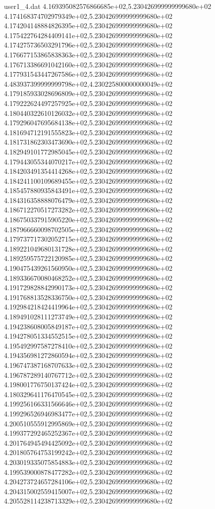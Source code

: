 \begin{filecontents}{user1_4.dat}
4.169395082576866685e+02,5.230426999999999680e+02
4.174168374702979349e+02,5.230426999999999680e+02
4.174204148884826395e+02,5.230426999999999680e+02
4.175422764284409141e+02,5.230426999999999680e+02
4.174275736503291796e+02,5.230426999999999680e+02
4.176677153865838363e+02,5.230426999999999680e+02
4.176713386691042160e+02,5.230426999999999680e+02
4.177931543447267586e+02,5.230426999999999680e+02
4.483937399999999798e+02,4.230225800000000049e+02
4.179185933028696809e+02,5.230426999999999680e+02
4.179222624497257925e+02,5.230426999999999680e+02
4.180440322610126032e+02,5.230426999999999680e+02
4.179296047695684138e+02,5.230426999999999680e+02
4.181694712191555823e+02,5.230426999999999680e+02
4.181731862303473690e+02,5.230426999999999680e+02
4.182949101772985045e+02,5.230426999999999680e+02
4.179443055344070217e+02,5.230426999999999680e+02
4.184203491354414268e+02,5.230426999999999680e+02
4.184241100109689455e+02,5.230426999999999680e+02
4.185457880935843491e+02,5.230426999999999680e+02
4.184316358888076479e+02,5.230426999999999680e+02
4.186712270517273282e+02,5.230426999999999680e+02
4.186750337915905220e+02,5.230426999999999680e+02
4.187966660098702505e+02,5.230426999999999680e+02
4.179737717302052715e+02,5.230426999999999680e+02
4.189221049680131728e+02,5.230426999999999680e+02
4.189259575722120985e+02,5.230426999999999680e+02
4.190475439261560950e+02,5.230426999999999680e+02
4.189336670080468252e+02,5.230426999999999680e+02
4.191729828842990173e+02,5.230426999999999680e+02
4.191768813528336750e+02,5.230426999999999680e+02
4.192984218424419964e+02,5.230426999999999680e+02
4.189491028111273749e+02,5.230426999999999680e+02
4.194238608005849187e+02,5.230426999999999680e+02
4.194278051334552515e+02,5.230426999999999680e+02
4.195492997587278410e+02,5.230426999999999680e+02
4.194356981272860594e+02,5.230426999999999680e+02
4.196747387168707633e+02,5.230426999999999680e+02
4.196787289140767712e+02,5.230426999999999680e+02
4.198001776750137424e+02,5.230426999999999680e+02
4.180329641176470545e+02,5.230426999999999680e+02
4.199256166331566646e+02,5.230426999999999680e+02
4.199296526946983477e+02,5.230426999999999680e+02
4.200510555912995869e+02,5.230426999999999680e+02
4.199377292465252367e+02,5.230426999999999680e+02
4.201764945494425092e+02,5.230426999999999680e+02
4.201805764753199242e+02,5.230426999999999680e+02
4.203019335075854883e+02,5.230426999999999680e+02
4.199539000878477282e+02,5.230426999999999680e+02
4.204273724657284106e+02,5.230426999999999680e+02
4.204315002559415007e+02,5.230426999999999680e+02
4.205528114238713329e+02,5.230426999999999680e+02

\end{filecontents}
